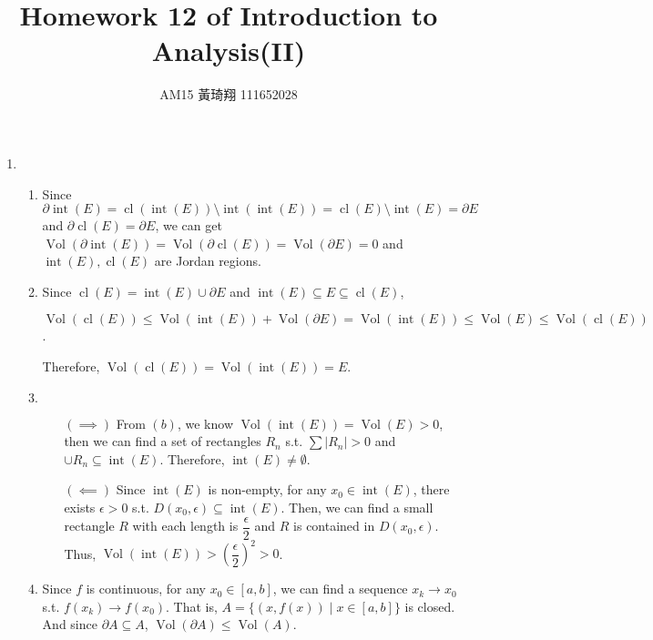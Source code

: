 \documentclass[12pt]{article}
\title{Homework 12 of Introduction to Analysis(II)}
\author{AM15 黃琦翔 111652028}
\DeclareMathOperator{\volume}{Vol}
\DeclareMathOperator{\interior}{int}
\DeclareMathOperator{\closure}{cl}
\newcommand{\boundary}{\partial}
\begin{document}
\maketitle
\begin{enumerate}
    \item \begin{enumerate}
        \item Since  $\boundary \interior(E) = \closure(\interior(E)) \setminus \interior(\interior(E)) = \closure(E) \setminus \interior(E) = \boundary E$ and $\boundary \closure(E) = \boundary E$,
        we can get $\volume(\boundary\interior(E)) = \volume(\boundary\closure(E)) = \volume(\boundary E) = 0$ and $\interior(E), \closure(E)$ are Jordan regions.

        \item Since $\closure(E) = \interior(E) \cup \boundary E$ and $\interior(E)\subseteq E \subseteq \closure(E)$,

        $\volume(\closure(E)) \leq \volume(\interior(E)) + \volume(\boundary E) = \volume(\interior(E))\leq \volume(E) \leq \volume(\closure(E))$.

        Therefore, $\volume(\closure(E)) = \volume(\interior(E)) = E$.

        \item $\ $
        \begin{enumerate}
            \item[$(\implies)$] From $(b)$, we know $\volume(\interior(E)) = \volume(E) > 0$, 
            then we can find a set of rectangles $R_n$ s.t. $\sum |R_n| > 0$ and $\cup R_n \subseteq \interior(E)$.
            Therefore, $\interior(E) \neq \emptyset$.

            \item[$(\impliedby)$] Since $\interior(E)$ is non-empty, for any $x_0\in \interior(E)$, there exists $\epsilon > 0$ s.t. $D(x_0, \epsilon) \subseteq \interior(E)$.
            Then, we can find a small rectangle $R$ with each length is $\dfrac{\epsilon}{2}$ and $R$ is contained in $D(x_0, \epsilon)$.
            Thus, $\volume(\interior(E)) > \left(\dfrac{\epsilon}{2}\right)^2 > 0$.
        \end{enumerate}

        \item Since $f$ is continuous, for any $x_0 \in [a, b]$, we can find a sequence $x_k \to x_0$ s.t. $f(x_k) \to f(x_0)$.
        That is, $A = \{(x, f(x)) \mid x\in [a, b]\}$ is closed.
        And since $\boundary A \subseteq A$, $\volume(\boundary A) \leq \volume(A)$.
        

\end{enumerate}
\end{enumerate}
\end{document}

